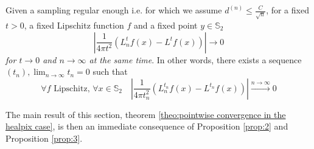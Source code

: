 \vspace{0.5cm}
\begin{prop}\label{prop:2}
	Given a sampling regular enough i.e. for which we assume $d^{(n)}\leq \frac{C}{\sqrt{n}}$, for a fixed $t>0$, a fixed Lipschitz function $f$ and a fixed point $y\in\mathbb S_2$
$$\left|\frac{1}{4\pi t^2}\left(L_n^tf(x) -L^tf(x)\right)\right|\rightarrow0$$
\textit{for $t\to0$ and $n\to\infty$ at the same time}. In other words, there exists a sequence $(t_n), \lim_{n\to\infty}t_n=0$ such that 
$$\forall f \text{ Lipschitz, } \forall x\in\mathbb S_2 \quad \left|\frac{1}{4\pi t_n^2}\left(L_n^{t_n}f(x) - L^{t_n}f(x)\right)\right|\xrightarrow{n\to \infty}0$$
\end{prop}
\vspace{0.5cm}

The main result of this section, theorem  \ref{theo:pointwise convergence in the healpix case}, is then an immediate consequence of Proposition \ref{prop:2} and Proposition \ref{prop:3}.


